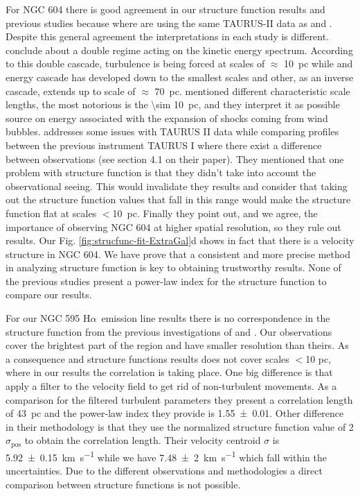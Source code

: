 \documentclass[fleqn,usenatbib, useAMS, a4paper]{mnras}
\newcommand\pos{\ensuremath{_{\mathrm{pos}}}}
\newcommand\halpha{H${\alpha}$}
\begin{document}
For NGC 604 there is good agreement in our structure function results and previous studies because where are using the same TAURUS-II data as \citet{Melnick:2021x} and \citet{Medina-Tanco:1997a}.
Despite this general agreement the interpretations in each study is different.
\citet{Medina-Tanco:1997a} conclude about a double regime acting on the kinetic energy spectrum.
According to this double cascade, turbulence is being forced at scales of \(\approx\) \SI{10}{pc} while and energy cascade has developed down to the smallest scales and other, as an inverse cascade, extends up to scale of \(\approx\) \SI{70}{pc}.
\citet{Medina-Tanco:1997a} mentioned different characteristic scale lengths, the most notorious is the \SI{\sim 10}{pc}, and they interpret it as possible source on energy associated with the expansion of shocks coming from wind bubbles.  
\citet{Melnick:2021x} addresses some issues with TAURUS II data while comparing profiles between the previous instrument TAURUS I where there exist a difference between observations (see section 4.1 on their paper).
They mentioned that one problem with \citet{Medina-Tanco:1997a} structure function is that they didn't take into account the observational seeing.
This would invalidate they results and \citet{Melnick:2021x} consider that taking out the structure function values that fall in this range would make the structure function flat at scales \(<\)\SI{10}{pc}.
Finally they point out, and we agree, the importance of observing NGC 604 at higher spatial resolution, so they rule out \citet{Medina-Tanco:1997a} results. 
Our Fig. \ref{fig:strucfunc-fit-ExtraGal}d shows in fact that there is a velocity structure in NGC 604. 
We have prove that a consistent and more precise method in analyzing structure function is key to obtaining trustworthy results.
None of the previous studies present a power-law index for the structure function to compare our results.

For our NGC 595 \halpha\ emission line results there is no correspondence in the structure function from the previous investigations of \citet{lagrois2009multi} and \citet{lagrois2011}.
Our observations cover the brightest part of the region and have smaller resolution than theirs.
As a consequence \citet{lagrois2009multi} and \citet{lagrois2011} structure functions results does not cover scales $<$10 pc, where in our results the correlation is taking place.
One big difference is that \citet{lagrois2011} apply a  filter to the velocity field to get rid of non-turbulent movements.
As a comparison for the filtered turbulent parameters they present a correlation length of \SI{43}{pc} and the power-law index they provide is \num{1.55 \pm 0.01}.
Other difference in their methodology is that they use the normalized structure function value of 2\(\sigma\pos\) to obtain the correlation length.
Their velocity centroid \(\sigma\) is \SI{5.92 \pm 0.15}{km.s^{-1}} while we have \SI{7.48\pm 2}{km. s^{-1}} which fall within the uncertainties.
Due to the different observations and methodologies a direct comparison between structure functions is not possible.
\end{document}
